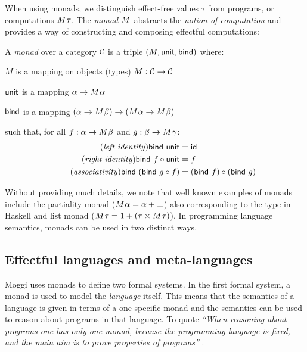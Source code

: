 When using monads, we distinguish effect-free values $\tau$ from programs, or
computations $M^{}\tau$. The \emph{monad} $M^{}$ abstracts the \emph{notion of
computation} and provides a way of constructing and composing effectful computations:
%
\begin{definition}
A \emph{monad} over a category $\mathcal{C}$ is a triple $(M, \textnormal{\sffamily unit}, \textnormal{\sffamily bind})$ where:
\begin{compactitem}
\item $M$ is a mapping on objects (types) $M : \mathcal{C} \rightarrow \mathcal{C}$
\item $\textnormal{\sffamily unit}$ is a mapping $\alpha \rightarrow M^{}\alpha$
\item $\textnormal{\sffamily bind}$ is a mapping $(\alpha \rightarrow M^{}\beta)
  \rightarrow (M^{}\alpha \rightarrow M^{}\beta)$
\end{compactitem}
such that, for all $f:\alpha \rightarrow M^{}\beta$ and $g:\beta \rightarrow M^{}\gamma$:
\begin{align}
\tag{\emph{left identity}}
  \ident{bind}~\ident{unit} &= \idf{}
  \\
\tag{\emph{right identity}}
  \ident{bind}~f \circ \ident{unit} &= f
  \\
\tag{\emph{associativity}}
  \ident{bind}~(\ident{bind}~g \circ f) &= (\ident{bind}~f) \circ (\ident{bind}~g)
\end{align}
\end{definition}

\noindent
Without providing much details, we note that well known examples of monads include the partiality
monad ($M^{}\alpha = \alpha + {\bot}$) also corresponding to the  type in
Haskell and list monad ($M^{}\tau = 1 + (\tau \times M^{}\tau)$).
In programming language semantics, monads can be used in two distinct ways.


\subsection{Effectful languages and meta-languages}
\label{sec:path-sem-langs}

Moggi uses monads to define two formal systems. In the first formal system, a monad is used to model
the \emph{language} itself. This means that the semantics of a language is given in terms of a
one specific monad and the semantics can be used to reason about programs in that language. To quote
\emph{``When reasoning about programs one has only one monad, because the programming language is
fixed, and the main aim is to prove properties of programs''} \cite[p. 5]{monad-notions}.

